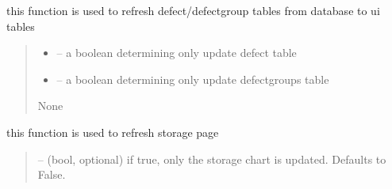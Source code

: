 \documentclass[letterpaper,10pt,english]{sphinxmanual}
\begin{document}
\begin{savenotes}
\begin{fulllineitems}
\begin{savenotes}\begin{fulllineitems}
\label{\detokenize{setting/setting_api:oxin.setting_api.API.refresh_defects_table}}
\pysigstartsignatures
{}
\pysigstopsignatures
\sphinxAtStartPar
this function is used to refresh defect/defect\sphinxhyphen{}group tables from database to ui tables
\begin{quote}\begin{description}
\begin{itemize}
\item {} 
\sphinxAtStartPar
{} – a boolean determining only update defect table

\item {} 
\sphinxAtStartPar
{} – a boolean determining only update defect\sphinxhyphen{}groups table

\end{itemize}

\sphinxAtStartPar
None

\end{description}\end{quote}

\end{fulllineitems}\end{savenotes}


\begin{savenotes}\begin{fulllineitems}
\label{\detokenize{setting/setting_api:oxin.setting_api.API.refresh_storege_page}}
\pysigstartsignatures
{}
\pysigstopsignatures
\sphinxAtStartPar
this function is used to refresh storage page
\begin{quote}\begin{description}
\sphinxAtStartPar
{} – (bool, optional) if true, only the storage chart is updated. Defaults to False.


\end{description}
\end{quote}
\end{fulllineitems}
\end{savenotes}
\end{fulllineitems}
\end{savenotes}
\end{document}
